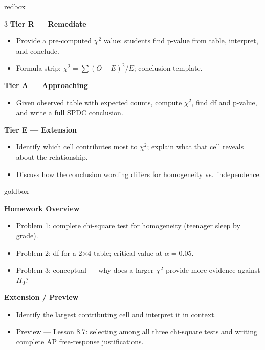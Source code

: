 \documentclass[10pt]{article}
\begin{document}
\begin{skillbox}{redbox}
\begin{multicols}{3}
    \textbf{Tier R --- Remediate}
    \begin{itemize}
        \item Provide a pre-computed $\chi^2$ value; students find p-value from table, interpret, and conclude.
        \item Formula strip: $\chi^2 = \sum(O-E)^2/E$; conclusion template.
    \end{itemize}
    \columnbreak
    \textbf{Tier A --- Approaching}
    \begin{itemize}
        \item Given observed table with expected counts, compute $\chi^2$, find df and p-value, and write a full SPDC conclusion.
    \end{itemize}
    \columnbreak
    \textbf{Tier E --- Extension}
    \begin{itemize}
        \item Identify which cell contributes most to $\chi^2$; explain what that cell reveals about the relationship.
        \item Discuss how the conclusion wording differs for homogeneity vs.\ independence.
    \end{itemize}
\end{multicols}
\end{skillbox}

\begin{skillbox}{goldbox}
\begin{minipage}[t]{0.48\linewidth}
    \textbf{Homework Overview}
    \begin{itemize}
        \item Problem 1: complete chi-square test for homogeneity (teenager sleep by grade).
        \item Problem 2: df for a 2$\times$4 table; critical value at $\alpha = 0.05$.
        \item Problem 3: conceptual --- why does a larger $\chi^2$ provide more evidence against $H_0$?
    \end{itemize}
\end{minipage}
\hfill
\begin{minipage}[t]{0.48\linewidth}
    \textbf{Extension / Preview}
    \begin{itemize}
        \item Identify the largest contributing cell and interpret it in context.
        \item Preview --- Lesson 8.7: selecting among all three chi-square tests and writing complete AP free-response justifications.
    \end{itemize}
\end{minipage}
\end{skillbox}
\end{document}
